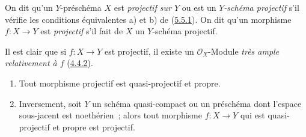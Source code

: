 
\begin{definition}[5.5.2]
\label{II.5.5.2-fr}
On dit qu'un $Y$-préschéma $X$ est \emph{projectif sur $Y$} ou est un
\emph{$Y$-schéma projectif} s'il vérifie les conditions équivalentes a) et b)
de (\hyperref[II.5.5.1-fr]{5.5.1}). On dit qu'un morphisme $f:X\to Y$ est
\emph{projectif} s'il fait de $X$ un $Y$-schéma projectif.
\end{definition}

Il est clair que si $f:X\to Y$ est projectif, il existe un
$\mathcal{O}_X$-Module \emph{très ample relativement à $f$}
(\hyperref[II.4.4.2-fr]{4.4.2}).

\begin{theorem}[5.5.3]
\label{II.5.5.3-fr}
\begin{enumerate}
  \item[\rm{(i)}] Tout morphisme projectif est quasi-projectif et propre.
  \item[\rm{(ii)}] Inversement, soit $Y$ un schéma quasi-compact ou un
  préschéma dont l'espace sous-jacent est noethérien~; alors tout morphisme
  $f:X\to Y$ qui est quasi-projectif et propre est projectif.
\end{enumerate}
\end{theorem}

